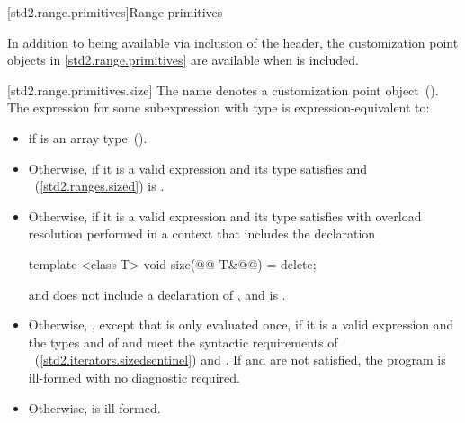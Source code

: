 [std2.range.primitives]{Range primitives}

\pnum
In addition to being available via inclusion of the 
header, the customization point objects in \ref{std2.range.primitives} are
available when  is included.

[std2.range.primitives.size]{}
\pnum
The name  denotes a customization point
object~(). The expression
 for some subexpression  with type
 is expression-equivalent to:

\begin{itemize}
\item
   if  is an array
  type~().

\item
  Otherwise,
  if it is a valid expression and its type  satisfies
   and
  ~(\ref{std2.ranges.sized})
  is .

\item
  Otherwise,
  if it is a valid expression and its type  satisfies 
  with overload resolution performed in a context that includes the
   declaration\added{:}
  \begin{codeblock}
  template <class T> void size(@@ T&@\added{\&}@) = delete;
  \end{codeblock}
  and does not include a declaration of , and
   is .

\item
  Otherwise,
  ,
  except that  is only evaluated once, if it is a valid expression and
  the types  and  of  and
   meet the syntactic requirements
  of ~(\ref{std2.iterators.sizedsentinel}) and
  . If  and
   are not satisfied, the program is ill-formed
  with no diagnostic required.

\item
  Otherwise,  is ill-formed.
\end{itemize}

